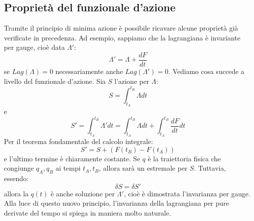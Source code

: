 \documentclass[a4paper,openany]{article}
\begin{document}
\subsection{Proprietà del funzionale d'azione}
	Tramite il principio di minima azione è possibile ricavare alcune proprietà già verificate in precedenza. Ad esempio, sappiamo che la lagrangiana è invariante per gauge, cioè data $\Lambda'$:
	$$
	\Lambda' = \Lambda + \dfrac{dF}{dt}
	$$
	se $Lag(\Lambda)=0$ necessariamente anche $Lag(\Lambda')=0$. Vediamo cosa succede a livello del funzionale d'azione.
	Sia $S$ l'azione per $\Lambda$:
	$$
	S = \int_{t_A}^{t_B} \Lambda dt
	$$
	e 
	$$
	S' = \int_{t_A}^{t_B} \Lambda' dt = \int_{t_A}^{t_B} \Lambda dt + \int_{t_A}^{t_B} \dfrac{dF}{dt} dt
	$$
	Per il teorema fondamentale del calcolo integrale:
	$$
	S' = S + (F(t_B)-F(t_A))
	$$
	e l'ultimo termine è chiaramente costante. Se $q$ è la traiettoria fisica che congiunge $q_A, q_B$ ai tempi $t_A, t_B$, allora sarà un estremale per $S$. Tuttavia, essendo:
	$$
	\delta S = \delta S'
	$$
	allora la $q(t)$ è anche soluzione per $\Lambda'$, cioè è dimostrata l'invarianza per gauge. Alla luce di questo nuovo principio, l'invarianza della lagrangiana per pure derivate del tempo si spiega in maniera molto naturale.
\end{document}
